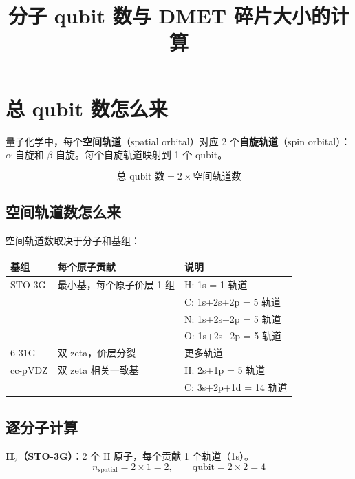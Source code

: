 \documentclass[11pt,a4paper]{article}
\title{分子 qubit 数与 DMET 碎片大小的计算}
\author{}
\date{}
\begin{document}
\maketitle

\section{总 qubit 数怎么来}

量子化学中，每个\textbf{空间轨道}（spatial orbital）对应 2 个\textbf{自旋轨道}（spin orbital）：$\alpha$ 自旋和 $\beta$ 自旋。每个自旋轨道映射到 1 个 qubit。

\begin{equation}
  \text{总 qubit 数} = 2 \times \text{空间轨道数}
\end{equation}

\subsection{空间轨道数怎么来}

空间轨道数取决于分子和基组：

\begin{center}
\begin{tabular}{lll}
  \toprule
  基组 & 每个原子贡献 & 说明 \\
  \midrule
  STO-3G & 最小基，每个原子价层 1 组 & H: 1s = 1 轨道 \\
         & & C: 1s+2s+2p = 5 轨道 \\
         & & N: 1s+2s+2p = 5 轨道 \\
         & & O: 1s+2s+2p = 5 轨道 \\
  6-31G & 双 zeta，价层分裂 & 更多轨道 \\
  cc-pVDZ & 双 zeta 相关一致基 & H: 2s+1p = 5 轨道 \\
         & & C: 3s+2p+1d = 14 轨道 \\
  \bottomrule
\end{tabular}
\end{center}

\subsection{逐分子计算}

\textbf{H$_2$（STO-3G）}：2 个 H 原子，每个贡献 1 个轨道（1s）。
\begin{equation}
  n_{\text{spatial}} = 2 \times 1 = 2, \qquad \text{qubit} = 2 \times 2 = 4
\end{equation}
\end{document}
